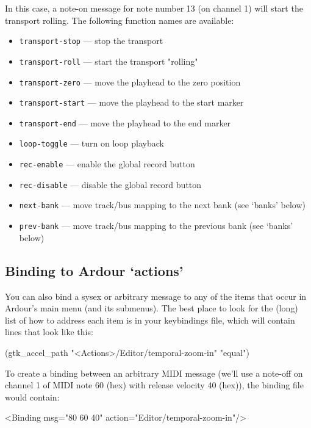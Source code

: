 \documentclass[10pt,a4paper]{book}
\begin{document}
In this case, a note-on message for note number 13 (on channel 1) will
start the transport rolling. The following function names are
available:

\begin{itemize}
\item \texttt{transport-stop} --- stop the transport 
\item \texttt{transport-roll} --- start the transport "rolling" 
\item \texttt{transport-zero} --- move the playhead to the zero position 
\item \texttt{transport-start} --- move the playhead to the start marker 
\item \texttt{transport-end} --- move the playhead to the end marker 
\item \texttt{loop-toggle} --- turn on loop playback 
\item \texttt{rec-enable} --- enable the global record button 
\item \texttt{rec-disable} --- disable the global record button 
\item \texttt{next-bank} --- move track/bus mapping to the next bank (see `banks' below) 
\item \texttt{prev-bank} --- move track/bus mapping to the previous bank (see `banks' below) 
\end{itemize}

\subsection{Binding to Ardour `actions'}

You can also bind a sysex or arbitrary message to any of the items
that occur in Ardour's main menu (and its submenus). The best place to
look for the (long) list of how to address each item is in your
keybindings file, which will contain lines that look like this:

\begin{listing}
(gtk\_accel\_path "<Actions>/Editor/temporal-zoom-in" "equal")
\end{listing}

To create a binding between an arbitrary MIDI message (we'll use a
note-off on channel 1 of MIDI note 60 (hex) with release velocity 40
(hex)), the binding file would contain:

\begin{listing}
<Binding msg="80 60 40" action="Editor/temporal-zoom-in"/>
\end{listing}
\end{document}
